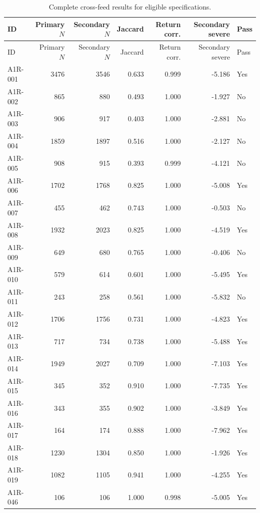 \begingroup\scriptsize\setlength{\tabcolsep}{2.5pt}
\begin{longtable}{lrrrrrl}
\caption{Complete cross-feed results for eligible specifications.}\label{tab:s_crossfeed}\\
\toprule ID & Primary $N$ & Secondary $N$ & Jaccard & Return corr. & Secondary severe & Pass \\
\midrule\endfirsthead
\toprule ID & Primary $N$ & Secondary $N$ & Jaccard & Return corr. & Secondary severe & Pass \\
\midrule\endhead
A1R-001 & 3476 & 3546 & 0.633 & 0.999 & -5.186 & Yes \\
A1R-002 & 865 & 880 & 0.493 & 1.000 & -1.927 & No \\
A1R-003 & 906 & 917 & 0.403 & 1.000 & -2.881 & No \\
A1R-004 & 1859 & 1897 & 0.516 & 1.000 & -2.127 & No \\
A1R-005 & 908 & 915 & 0.393 & 0.999 & -4.121 & No \\
A1R-006 & 1702 & 1768 & 0.825 & 1.000 & -5.008 & Yes \\
A1R-007 & 455 & 462 & 0.743 & 1.000 & -0.503 & No \\
A1R-008 & 1932 & 2023 & 0.825 & 1.000 & -4.519 & Yes \\
A1R-009 & 649 & 680 & 0.765 & 1.000 & -0.406 & No \\
A1R-010 & 579 & 614 & 0.601 & 1.000 & -5.495 & Yes \\
A1R-011 & 243 & 258 & 0.561 & 1.000 & -5.832 & No \\
A1R-012 & 1706 & 1756 & 0.731 & 1.000 & -4.823 & Yes \\
A1R-013 & 717 & 734 & 0.738 & 1.000 & -5.488 & Yes \\
A1R-014 & 1949 & 2027 & 0.709 & 1.000 & -7.103 & Yes \\
A1R-015 & 345 & 352 & 0.910 & 1.000 & -7.735 & Yes \\
A1R-016 & 343 & 355 & 0.902 & 1.000 & -3.849 & Yes \\
A1R-017 & 164 & 174 & 0.888 & 1.000 & -7.962 & Yes \\
A1R-018 & 1230 & 1304 & 0.850 & 1.000 & -1.926 & Yes \\
A1R-019 & 1082 & 1105 & 0.941 & 1.000 & -4.255 & Yes \\
A1R-046 & 106 & 106 & 1.000 & 0.998 & -5.005 & Yes \\
\bottomrule
\end{longtable}
\endgroup

